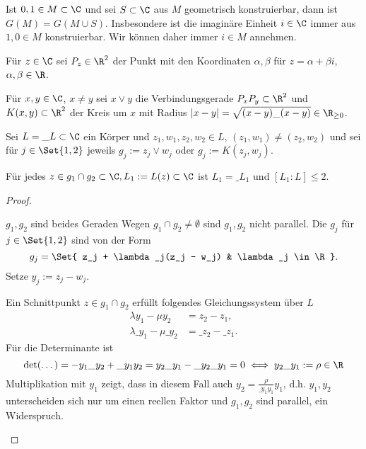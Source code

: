 Ist $0, 1 \in M \subset \C$ und sei $S \subset \C$ aus $M$ geometrisch konstruierbar, dann ist $G(M) = G(M \cup S)$.
Insbesondere ist die imaginäre Einheit $i \in \C$ immer aus $1, 0 \in M$ konstruierbar.
Wir können daher immer $i \in M$ annehmen.

Für $z \in \C$ sei $P_z \in \R^2$ der Punkt mit den Koordinaten $\alpha, \beta$ für $z = \alpha + \beta i$, $\alpha, \beta \in \R$.

\begin{conv} \label{18.5-5}
	Für $x,y \in \C$, $x \neq y$ sei $x \vee y$ die Verbindungsgerade $P_x P_y \subset \R^2$ und $K(x, y) \subset \R^2$ der Kreis um $x$ mit Radius $|x-y| = \sqrt{(x-y)\_{(x-y)}} \in \R_{\ge 0}$.
\end{conv}

\begin{st} \label{18.5-6}
	Sei $L = \_L \subset \C$ ein Körper und $z_1, w_1, z_2, w_2 \in L$, $(z_1, w_1) \neq (z_2, w_2)$ und sei für $j \in \Set{1, 2}$ jeweils $g_j := z_j \vee w_j$ oder $g_j := K(z_j, w_j)$.

	Für jedes $z \in g_1 \cap g_2 \subset \C, L_1 := L(z) \subset \C$ ist $L_1 = \_{L_1}$ und $[L_1 : L] \le 2$.
	\begin{proof}
		\begin{seg}{$g_1, g_2$ sind beides Geraden}
			Wegen $g_1 \cap g_2 \neq \emptyset$ sind $g_1, g_2$ nicht parallel.
			Die $g_j$ für $j \in \Set{1,2}$ sind von der Form
			\[
				g_j = \Set{ z_j + \lambda_j(z_j - w_j) & \lambda_j \in \R }.
			\]
			Setze $y_j := z_j - w_j$.

			Ein Schnittpunkt $z \in g_1 \cap g_2$ erfüllt folgendes Gleichungssystem über $L$
			\begin{align*}
				\lambda y_1 - \mu y_2 &= z_2 - z_1, \\
				\lambda \_{y_1} - \mu \_{y_2} &= \_{z_2} - \_{z_1}.
			\end{align*}
			Für die Determinante ist
			\[
				\det(\dotso)
				= -y_1 \_{y_2} + \_{y_1}y_2 = y_2 \_{y_1} - \_{y_2 \_{y_1}}
				= 0
				\iff y_2 \_{y_1} := \rho \in \R
			\]
			Multiplikation mit $y_1$ zeigt, dass in diesem Fall auch $y_2 = \frac{\rho}{\_{y_1}y_1} y_1$, d.h. $y_1, y_2$ unterscheiden sich nur um einen reellen Faktor und $g_1, g_2$ sind parallel, ein Widerspruch.


\end{seg}
\end{proof}
\end{st}
